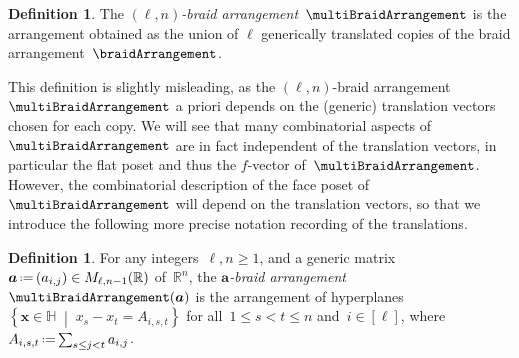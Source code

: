 \documentclass{amsart}
\newcommand{\darkblue}{\color{darkblue}} %
\theoremstyle{definition}
\newtheorem{definition}[theorem]{Definition}
\newtheorem{remark}[theorem]{Remark}
\newcommand{\R}{\mathbb{R}} %
\renewcommand{\b}[1]{{\boldsymbol{#1}}} %
\newcommand{\set}[2]{\left\{ #1 \;\middle|\; #2 \right\}} %
\newcommand{\eqdef}{\mbox{\,\raisebox{0.2ex}{\scriptsize\ensuremath{\mathrm:}}\ensuremath{=}\,}} %
\newcommand{\defn}[1]{\textsl{\darkblue #1}} %
\renewcommand{\b}[1]{\boldsymbol{#1}} %
\newcommand{\HH}{\mathbb{H}} %
\begin{document}
\begin{definition}
\label{def:multiBraidArrangement}
The \defn{$(\ell,n)$-braid arrangement}~$\multiBraidArrangement$ is the arrangement obtained as the union of $\ell$ generically translated copies of the braid arrangement~$\braidArrangement$.
\end{definition}

This definition is slightly misleading, as the $(\ell,n)$-braid arrangement~$\multiBraidArrangement$ a priori depends on the (generic) translation vectors chosen for each copy.
We will see that many combinatorial aspects of~$\multiBraidArrangement$ are in fact independent of the translation vectors, in particular the flat poset and thus the $f$-vector of~$\multiBraidArrangement$.
However, the combinatorial description of the face poset of~$\multiBraidArrangement$ will depend on the translation vectors, so that we introduce the following more precise notation recording of the translations.

\begin{definition}
\label{def:multiBraidArrangementPrecise}
For any integers~$\ell,n \geq 1$, and a generic matrix~$\b{a} \eqdef (a_{i,j}) \in M_{\ell,n-1}(\R)$ of~$\R^n$, the \defn{$\b{a}$-braid arrangement}~$\multiBraidArrangement(\b{a})$ is the arrangement of hyperplanes~$\set{\b{x} \in \HH}{x_s - x_t = A_{i,s,t}}$ for all~$1 \le s < t \le n$ and~$i \in [\ell]$, where $A_{i,s,t} \eqdef \smash{\sum_{s \le j < t} a_{i,j}}$.
\end{definition}

\end{document}
